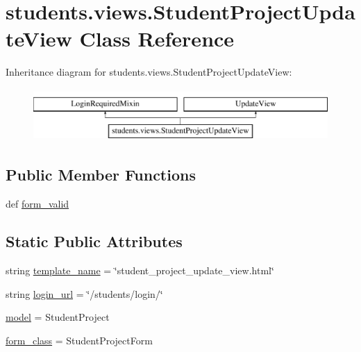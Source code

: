 \hypertarget{classstudents_1_1views_1_1_student_project_update_view}{\section{students.\-views.\-Student\-Project\-Update\-View Class Reference}
\label{classstudents_1_1views_1_1_student_project_update_view}
}
Inheritance diagram for students.\-views.\-Student\-Project\-Update\-View\-:\begin{figure}[H]
\begin{center}
\leavevmode
\includegraphics[height=2.000000cm]{classstudents_1_1views_1_1_student_project_update_view}
\end{center}
\end{figure}
\subsection*{Public Member Functions}
\begin{DoxyCompactItemize}
\item 
def \hyperlink{classstudents_1_1views_1_1_student_project_update_view_a6691a76d37261d83f717cfd00103fc26}{form\-\_\-valid}
\end{DoxyCompactItemize}
\subsection*{Static Public Attributes}
\begin{DoxyCompactItemize}
\item 
string \hyperlink{classstudents_1_1views_1_1_student_project_update_view_a7f1c65fd35f5879a287cf60e771c5264}{template\-\_\-name} = \char`\"{}student\-\_\-project\-\_\-update\-\_\-view.\-html\char`\"{}
\item 
string \hyperlink{classstudents_1_1views_1_1_student_project_update_view_af6c8e5b58fd16051dd25dfc3b1607396}{login\-\_\-url} = \char`\"{}/students/login/\char`\"{}
\item 
\hyperlink{classstudents_1_1views_1_1_student_project_update_view_a2a2505466ef2e027d8b58958dca7da67}{model} = Student\-Project
\item 
\hyperlink{classstudents_1_1views_1_1_student_project_update_view_a26de4f28da2fbe3e2c424edb2c791d20}{form\-\_\-class} = Student\-Project\-Form
\end{DoxyCompactItemize}



